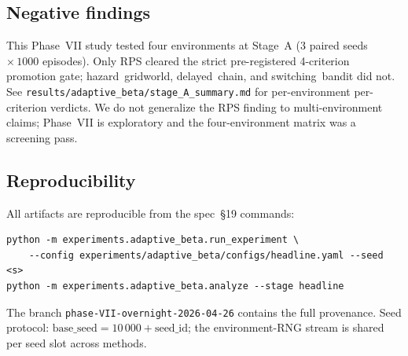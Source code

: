 \subsection{Negative findings}

This Phase~VII study tested four environments at Stage~A (3 paired seeds
$\times\,1000$ episodes).  Only RPS cleared the strict pre-registered
4-criterion promotion gate; hazard~gridworld, delayed~chain, and
switching~bandit did not.  See \texttt{results/adaptive\_beta/stage\_A\_summary.md}
for per-environment per-criterion verdicts.  We do not generalize the
RPS finding to multi-environment claims; Phase~VII is exploratory and
the four-environment matrix was a screening pass.

\subsection{Reproducibility}

All artifacts are reproducible from the spec~§19 commands:
\begin{verbatim}
python -m experiments.adaptive_beta.run_experiment \
    --config experiments/adaptive_beta/configs/headline.yaml --seed <s>
python -m experiments.adaptive_beta.analyze --stage headline
\end{verbatim}
The branch \texttt{phase-VII-overnight-2026-04-26} contains the full
provenance.  Seed protocol: $\mathrm{base\_seed}=10\,000+\mathrm{seed\_id}$;
the environment-RNG stream is shared per seed slot across methods.
